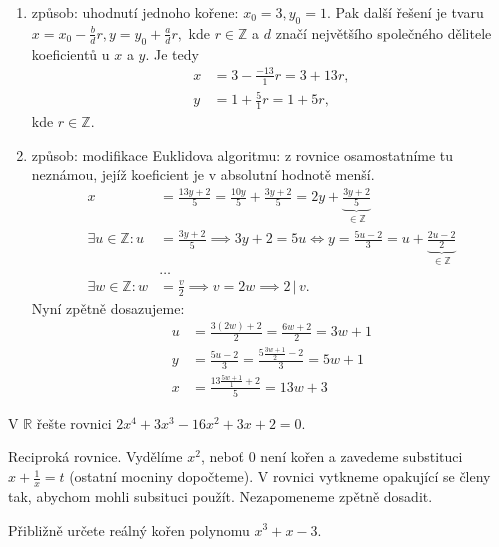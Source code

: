 \begin{reseni}
\begin{enumerate}[1.]
\item způsob: uhodnutí jednoho kořene: $x_0=3, y_0=1.$ Pak další řešení je tvaru
$x=x_0-\frac{b}{d}r, y=y_0+\frac{a}{d}r,$ kde $r \in \mathbb Z$ a $d$ značí
největšího společného dělitele koeficientů u $x$ a $y$. Je tedy
\begin{align*}
    x&=3-\frac{-13}{1}r=3+13r, \\
    y &= 1+\frac{5}{1}r = 1+5r,
\end{align*}
kde $r\in \mathbb Z.$
\item způsob: modifikace Euklidova algoritmu: z rovnice osamostatníme tu neznámou,
jejíž koeficient je v absolutní hodnotě menší.
\begin{align*}
    x &= \frac{13y+2}{5}=\frac{10y}{5}+\frac{3y+2}{5}=2y+\underbrace{\frac{3y+2}{5}}_{\in \mathbb Z}\\
    \exists u \in \mathbb Z: u &= \frac{3y+2}{5}\implies 3y+2=5u \iff y=\frac{5u-2}{3}=u+\underbrace{\frac{2u-2}{2}}_{\in \mathbb Z} \\
     & \dots \\
     \exists w \in \mathbb Z: w &= \frac{v}{2}\implies v = 2w \implies 2 \, | \, v.
\end{align*}
Nyní zpětně dosazujeme:
\begin{align*}
    u&= \frac{3(2w)+2}{2}=\frac{6w+2}{2}=3w+1\\
    y&=\frac{5u-2}{3}=\frac{5 \frac{3w+1}{2}-2}{3}=5w+1 \\
    x &= \frac{13 \frac{5w+1}{1}+2}{5}=13w+3
\end{align*}
\end{enumerate}
\end{reseni}

\begin{priklad}
V $\mathbb R$ řešte rovnici $2x^4+3x^3-16x^2+3x+2=0.$
\end{priklad}

\begin{reseni}
Reciproká rovnice. Vydělíme $x^2$, neboť 0 není kořen a zavedeme substituci
$x+\frac{1}{x}=t$ (ostatní mocniny dopočteme). V rovnici vytkneme opakující se členy
tak, abychom mohli  subsituci použít. Nezapomeneme zpětně dosadit.
\end{reseni}

\begin{priklad}
Přibližně určete reálný kořen polynomu $x^3+x-3$.
\end{priklad}

